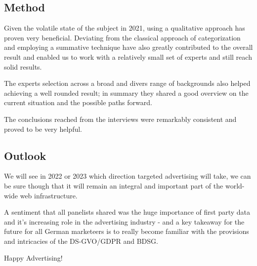 \subsection{Method}

Given the volatile state of the subject in 2021, using a qualitative approach has proven very beneficial. Deviating from the classical approach of categorization and employing a summative technique have also greatly contributed to the overall result and enabled us to work with a relatively small set of experts and still reach solid results.

The experts selection across a broad and divers range of backgrounds also helped achieving a well rounded result; in summary they shared a good overview on the current situation and the possible paths forward.

The conclusions reached from the interviews were remarkably consistent and proved to be very helpful.

\subsection{Outlook}

We will see in 2022 or 2023 which direction targeted advertising will take, we can be sure though that it will remain an integral and important part of the world-wide web infrastructure.

A sentiment that all panelists shared was the huge importance of first party data and it's increasing role in the advertising industry - and a key takeaway for the future for all German marketeers is to really become familiar with the provisions and intricacies of the DS-GVO/GDPR and BDSG.


Happy Advertising!
